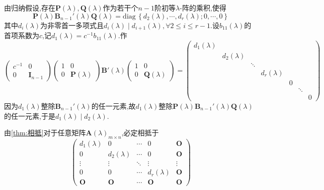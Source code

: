 \begin{formal}
\begin{Proof}
由归纳假设,存在$\bm{P}\left(\lambda\right),\bm{Q}\left(\lambda\right)$作为若干个$n-1$阶初等$\lambda$-阵的乘积,使得
\[
\bm{P}\left(\lambda\right)\bm{B}_{n-1}'\left(\lambda\right)\bm{Q}\left(\lambda\right)=\mathrm{diag}\,\left\{
    d_2\left(\lambda\right),\cdots,d_r\left(\lambda\right);0,\cdots,0
\right\}
\]
其中$d_i\left(\lambda\right)$为非零首一多项式且$d_i\left(\lambda\right)\mid d_{i+1}\left(\lambda\right),\forall 2\leqslant i\leqslant r-1$.设$b_{11}\left(\lambda\right)$的首项系数为$c$,记$d_1\left(\lambda\right)=c^{-1}b_{11}\left(\lambda\right).$作
\[
\begin{pmatrix}
    c^{-1}&0\\0&\bm{I}_{n-1}
\end{pmatrix}\begin{pmatrix}
    1&0\\0&\bm{P}\left(\lambda\right)
\end{pmatrix}\bm{B}'\left(\lambda\right)\begin{pmatrix}
    1&0\\0&\bm{Q}\left(\lambda\right)
\end{pmatrix}=
\begin{pmatrix}
    d_1\left(\lambda\right)&&&&&&\\
    &d_2\left(\lambda\right)&&&&&\\
    &&\ddots&&&&\\
    &&&d_r\left(\lambda\right)&&&\\
    &&&&0&&\\
    &&&&&\ddots&\\
    &&&&&&0
\end{pmatrix}
\]因为$d_1\left(\lambda\right)$整除$\bm{B}_{n-1}'\left(\lambda\right)$的任一元素,故$d_1\left(\lambda\right)$整除$\bm{P}\left(\lambda\right)\bm{B}_{n-1}'\left(\lambda\right)\bm{Q}\left(\lambda\right)$的任一元素,于是$d_1\left(\lambda\right)\mid d_2\left(\lambda\right)$.
\end{Proof}
\end{formal}
\begin{red}
\begin{remark}
    由\cref{thm:相抵}对于任意矩阵$\bm{A}\left(\lambda\right)_{m\times n}$,必定相抵于
    \[
    \begin{pmatrix}
        d_1\left(\lambda\right)&0&\cdots&0&\bm{O}\\
        0&d_2\left(\lambda\right)&\cdots&0&\bm{O}\\
        \vdots&\vdots&\ddots&\vdots&\vdots\\
        0&0&\cdots&d_r\left(\lambda\right)&\bm{O}\\
        \bm{O}&\bm{O}&\cdots&\bm{O}&\bm{O}
    \end{pmatrix}
    \]
\end{remark}
\end{red}
